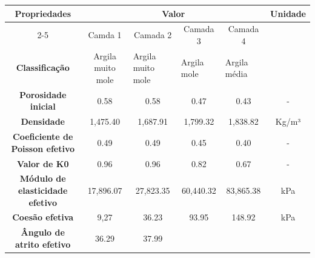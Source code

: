 \begin{table}[H]
	\centering
	\footnotesize %
	\renewcommand{\arraystretch}{1.2} %
	\setlength{\tabcolsep}{4pt} %
	\begin{tabular}{|cccccc|}
		\hline
		\multicolumn{1}{|c|}{\multirow{2}{*}{\textbf{Propriedades}}} &
		\multicolumn{4}{c|}{\textbf{Valor}} &
		\multirow{2}{*}{\textbf{Unidade}} \\ \cline{2-5}
		\multicolumn{1}{|c|}{} &
		\multicolumn{1}{c|}{Camda 1} &
		\multicolumn{1}{c|}{Camada 2} &
		\multicolumn{1}{c|}{Camada 3} &
		\multicolumn{1}{c|}{Camada 4} &
		\\ \hline
		\multicolumn{1}{|c|}{\textbf{Classificação}} &
		\multicolumn{1}{c|}{Argila muito mole} &
		\multicolumn{1}{l|}{Argila muito mole} &
		\multicolumn{1}{l|}{Argila mole} &
		\multicolumn{1}{l|}{Argila média} &
		\multicolumn{1}{l|}{} \\ \hline
		\multicolumn{1}{|c|}{\textbf{Porosidade inicial}} &
		\multicolumn{1}{c|}{0.58} &
		\multicolumn{1}{c|}{0.58} &
		\multicolumn{1}{c|}{0.47} &
		\multicolumn{1}{c|}{0.43} &
		- \\ \hline
		\multicolumn{1}{|c|}{\textbf{Densidade}} &
		\multicolumn{1}{c|}{1,475.40} &
		\multicolumn{1}{c|}{1,687.91} &
		\multicolumn{1}{c|}{1,799.32} &
		\multicolumn{1}{c|}{1,838.82} &
		Kg/m³ \\ \hline
		\multicolumn{1}{|c|}{\textbf{Coeficiente de Poisson \linebreak efetivo}} &
		\multicolumn{1}{c|}{0.49} &
		\multicolumn{1}{c|}{0.49} &
		\multicolumn{1}{c|}{0.45} &
		\multicolumn{1}{c|}{0.40} &
		- \\ \hline
		\multicolumn{1}{|c|}{\textbf{Valor de K0}} &
		\multicolumn{1}{c|}{0.96} &
		\multicolumn{1}{c|}{0.96} &
		\multicolumn{1}{c|}{0.82} &
		\multicolumn{1}{c|}{0.67} &
		- \\ \hline
		\multicolumn{1}{|c|}{\textbf{Módulo de elasticidade efetivo}} &
		\multicolumn{1}{c|}{17,896.07} &
		\multicolumn{1}{c|}{27,823.35} &
		\multicolumn{1}{c|}{60,440.32} &
		\multicolumn{1}{c|}{83,865.38} &
		kPa \\ \hline
		\multicolumn{1}{|c|}{\textbf{Coesão efetiva}} &
		\multicolumn{1}{c|}{9,27} &
		\multicolumn{1}{c|}{36.23} &
		\multicolumn{1}{c|}{93.95} &
		\multicolumn{1}{c|}{148.92} &
		kPa \\ \hline
		\multicolumn{1}{|c|}{\textbf{Ângulo de atrito efetivo}} &
		\multicolumn{1}{c|}{36.29} &
		\multicolumn{1}{c|}{37.99} &

\end{tabular}
\end{table}
